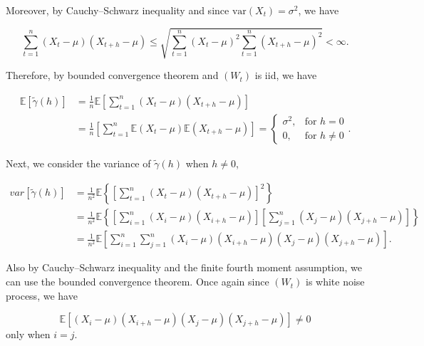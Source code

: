 \documentclass[]{book}
\theoremstyle{definition}
\theoremstyle{definition}
\theoremstyle{definition}
\theoremstyle{remark}
\begin{document}
{Moreover, by Cauchy--Schwarz inequality and since
\(\text{var}(X_t) = \sigma^2\), we have

\[
\sum\limits_{t = 1}^{n} {\left( {{X_t} - \mu} \right)\left( {{X_{t + h}} - \mu} \right)} \leq \sqrt{\sum\limits_{t = 1}^{n} {\left( {{X_t} - \mu} \right)^2} \sum\limits_{t = 1}^{n} {\left( {{X_{t + h}} - \mu} \right)^2}} < \infty.
\]

Therefore, by bounded convergence theorem and \((W_t)\) is iid, we have

\[\begin{aligned}
    \mathbb{E}[\tilde{\gamma} \left( h \right)] &= \frac{1}{n}\mathbb{E}\left[\sum\limits_{t = 1}^{n} {\left( {{X_t} - \mu} \right)\left( {{X_{t + h}} - \mu} \right)}\right]\\
    &= \frac{1}{n}\left[\sum\limits_{t = 1}^{n} { \mathbb{E}\left( {{X_t} - \mu} \right)\mathbb{E}\left( {{X_{t + h}} - \mu} \right)}\right] =
    \begin{cases}
        \sigma^2, & \text{for } h = 0\\
        0, & \text{for } h \neq 0
    \end{cases}.
    \end{aligned}
\]

Next, we consider the variance of \(\tilde{\gamma} \left( h \right)\)
when \(h \neq 0\),

\[
\begin{aligned}
        var[\tilde{\gamma} \left( h \right)] &= \frac{1}{n^2}\mathbb{E}\left\{\left[\sum\limits_{t = 1}^{n} {\left( {{X_t} - \mu} \right)\left( {{X_{t + h}} - \mu} \right)}\right]^2\right\}\\
        &= \frac{1}{n^2}\mathbb{E}\left\{\left[\sum\limits_{i = 1}^{n} {\left( {{X_i} - \mu} \right)\left( {{X_{i + h}} - \mu} \right)}\right] \left[\sum\limits_{j = 1}^{n} {\left( {{X_j} - \mu} \right)\left( {{X_{j + h}} - \mu} \right)}\right]\right\}\\
        &= \frac{1}{n^2}\mathbb{E}\left[\sum\limits_{i = 1}^{n}\sum\limits_{j = 1}^{n} {\left( {{X_i} - \mu} \right)\left( {{X_{i + h}} - \mu} \right)}{\left( {{X_j} - \mu} \right)\left( {{X_{j + h}} - \mu} \right)}\right].
    \end{aligned}
\]

Also by Cauchy--Schwarz inequality and the finite fourth moment
assumption, we can use the bounded convergence theorem. Once again since
\((W_t)\) is white noise process, we have

\[
\mathbb{E}\left[{\left( {{X_i} - \mu} \right)\left( {{X_{i + h}} - \mu} \right)}{\left( {{X_j} - \mu} \right)\left( {{X_{j + h}} - \mu} \right)}\right] \neq 0
\] only when \(i = j\).

}
\end{document}
